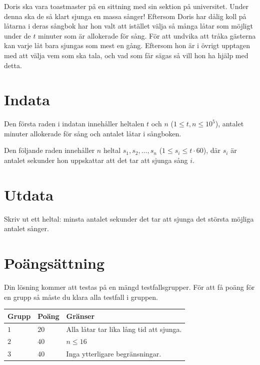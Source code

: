 Doris ska vara toastmaster på en sittning med sin sektion på universitet. Under denna ska de så klart sjunga en massa sånger! 
Eftersom Doris har dålig koll på låtarna i deras sångbok har hon valt att istället välja så många låtar som möjligt under de $t$ minuter som är allokerade för sång. 
För att undvika att tråka gästerna kan varje låt bara sjungas som mest en gång.
Eftersom hon är i övrigt upptagen med att välja vem som ska tala, och vad som får sägas så vill hon ha hjälp med detta.

\section*{Indata}
Den första raden i indatan innehåller heltalen $t$ och $n$ ($1 \leq t,n \leq 10^5$),
antalet minuter allokerade för sång och antalet låtar i sångboken.

Den följande raden innehåller $n$ heltal $s_1, s_2, \dots, s_n$ ($1 \leq s_i \leq t \cdot 60$),
där $s_i$ är antalet sekunder hon uppskattar att det tar att sjunga sång $i$.

\section*{Utdata}
Skriv ut ett heltal: minsta antalet sekunder det tar att sjunga det största möjliga antalet sånger.

\section*{Poängsättning}
Din lösning kommer att testas på en mängd testfallsgrupper.
För att få poäng för en grupp så måste du klara alla testfall i gruppen.

\noindent
\begin{tabular}{| l | l | p{12cm} |}
\hline
  \textbf{Grupp} & \textbf{Poäng} & \textbf{Gränser} \\ \hline
  $1$    & $20$       &  Alla låtar tar lika lång tid att sjunga. \\ \hline 
  $2$    & $40$       &  $n \leq 16$ \\ \hline
  $3$    & $40$       &  Inga ytterligare begränsningar. \\ \hline
\end{tabular}
